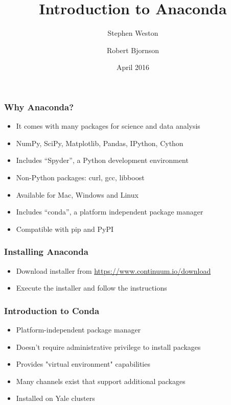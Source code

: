 \documentclass[10pt]{beamer}
\title{Introduction to Anaconda}
\author{{Stephen Weston} \and {Robert Bjornson}}
\institute[Yale]{
  Yale Center for Research Computing \\
  Yale University
}
\date{April 2016}
\begin{document}
\begin{frame}[plain]
  \titlepage
\end{frame}

\begin{frame}
\frametitle{Why Anaconda?}

\begin{itemize}
\item It comes with many packages for science and data analysis
\item NumPy, SciPy, Matplotlib, Pandas, IPython, Cython
\item Includes ``Spyder'', a Python development environment
\item Non-Python packages: curl, gcc, libboost
\item Available for Mac, Windows and Linux
\item Includes ``conda'', a platform independent package manager
\item Compatible with pip and PyPI
\end{itemize}
\end{frame}

\begin{frame}
\frametitle{Installing Anaconda}

\begin{itemize}
\item Download installer from \url{https://www.continuum.io/download}
\item Execute the installer and follow the instructions
\end{itemize}
\end{frame}

\begin{frame}
\frametitle{Introduction to Conda}
\begin{itemize}
\item Platform-independent package manager
\item Doesn't require administrative privilege to install packages
\item Provides "virtual environment" capabilities
\item Many channels exist that support additional packages
\item Installed on Yale clusters
\end{itemize}
\end{frame}
\end{document}
